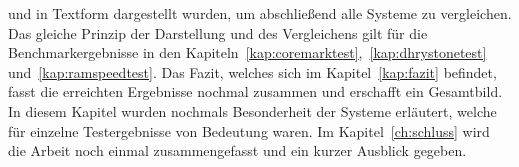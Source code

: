 und in Textform dargestellt wurden, um abschließend alle Systeme zu vergleichen.\\
Das gleiche Prinzip der Darstellung und des Vergleichens gilt für die Benchmarkergebnisse in den Kapiteln~\ref{kap:coremarktest},~\ref{kap:dhrystonetest} und~\ref{kap:ramspeedtest}.
Das Fazit, welches sich im Kapitel~\ref{kap:fazit} befindet, fasst die erreichten Ergebnisse nochmal zusammen und erschafft ein Gesamtbild. In diesem Kapitel wurden nochmals Besonderheit der
Systeme erläutert, welche für einzelne Testergebnisse von Bedeutung waren.
Im Kapitel~\ref{ch:schluss} wird die Arbeit noch einmal zusammengefasst und ein kurzer Ausblick gegeben.\\
